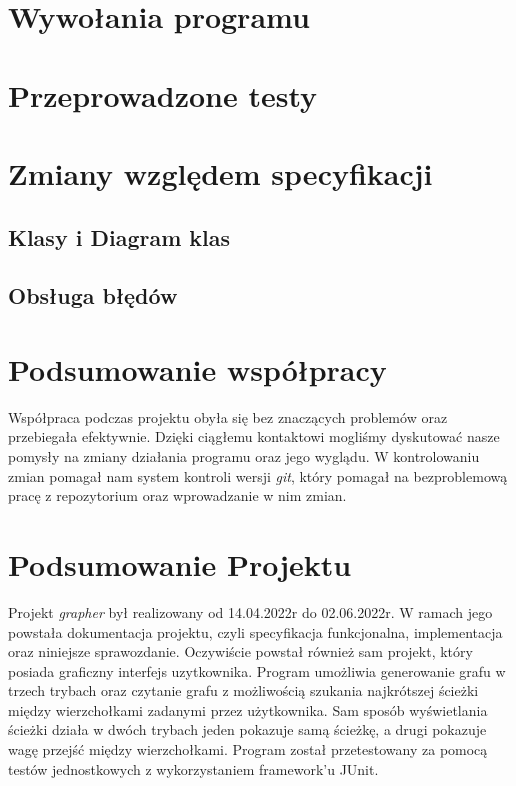 \documentclass[10pt, a4paper]{report}
\begin{document}
\newpage

\section{Wywołania programu}

\section{Przeprowadzone testy}

\section{Zmiany względem specyfikacji}
\subsection{Klasy i Diagram klas}

\subsection{Obsługa błędów}

\section{Podsumowanie współpracy}
Współpraca podczas projektu obyła się bez znaczących problemów oraz przebiegała efektywnie.
Dzięki ciągłemu kontaktowi mogliśmy dyskutować nasze pomysły na zmiany działania programu oraz jego wyglądu.
W kontrolowaniu zmian pomagał nam system kontroli wersji \textit{git}, który pomagał na bezproblemową pracę z repozytorium oraz wprowadzanie w nim zmian.

\section{Podsumowanie Projektu}
Projekt \textit{grapher} był realizowany od 14.04.2022r do 02.06.2022r. W ramach jego powstała dokumentacja projektu, czyli
specyfikacja funkcjonalna, implementacja oraz niniejsze sprawozdanie. Oczywiście powstał również sam projekt, który posiada graficzny interfejs uzytkownika.
Program umożliwia generowanie grafu w trzech trybach oraz czytanie grafu z możliwością szukania najkrótszej ścieżki między wierzchołkami zadanymi przez użytkownika.
Sam sposób wyświetlania ścieżki działa w dwóch trybach jeden pokazuje samą ścieżkę, a drugi pokazuje wagę przejść między wierzchołkami. Program został przetestowany za pomocą testów
jednostkowych z wykorzystaniem framework'u JUnit.
\end{document}
